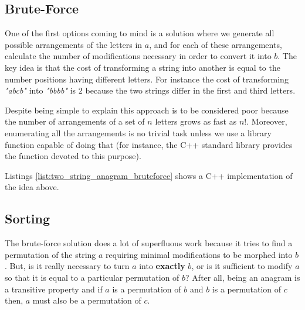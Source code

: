 \subsection{Brute-Force}
\label{sec:anagrams:bruteforce}


One of the first options coming to mind is a solution where we generate all possible arrangements of the letters in $a$, and
for each of these arrangements, calculate the number of modifications necessary in order to convert it into $b$. 
The key idea is that the cost of transforming a string into
another is equal to the number positions having different letters. 
For instance the cost of transforming \textit{"abcb"}
into \textit{"bbbb"} is $2$ because the two strings differ in the first and third letters. 

Despite being simple to explain this approach is to be considered poor because the number
of arrangements of a set of $n$ letters grows as fast as $n!$.
Moreover, enumerating all the arrangements is no trivial task unless we use a  library function capable of doing that (for instance, the C++ standard library provides the function \href{https://en.cppreference.com/w/cpp/algorithm/next_permutation}{} devoted to this purpose).

Listings \ref{list:two_string_anagram_bruteforce} shows a C++ implementation of the idea above.




\subsection{Sorting}
\label{sec:anagrams:sorting}

The brute-force solution does a lot of superfluous work because it tries to find a permutation of the string $a$
requiring minimal modifications to be morphed into $b$.
But, is it really necessary to turn $a$ into \textbf{exactly} $b$, or is it sufficient to modify $a$ so that it is equal to a particular permutation of $b$? 
After all, being an anagram is a transitive property and if $a$ is a permutation of $b$ and $b$ is a permutation of $c$ then, $a$ must also be a permutation of $c$. 

